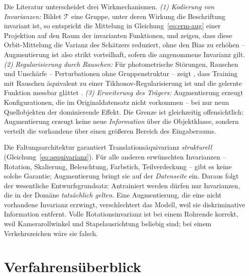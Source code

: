Die Literatur unterscheidet drei Wirkmechanismen. \emph{(1) Kodierung von
Invarianzen:} Bildet $\mathcal{T}$ eine Gruppe, unter deren Wirkung die
Beschriftung invariant ist, so entspricht die Mittelung in
Gleichung~\eqref{eq:erm-aug} einer Projektion auf den Raum der invarianten
Funktionen, und \textcite{chen2020group} zeigen, dass diese Orbit-Mittelung die
Varianz des Schätzers reduziert, ohne den Bias zu erhöhen -- Augmentierung ist
also strikt vorteilhaft, sofern die angenommene Invarianz gilt.
\emph{(2) Regularisierung durch Rauschen:} Für photometrische Störungen, Rauschen
und Unschärfe -- Perturbationen ohne Gruppenstruktur -- zeigt
\textcite{bishop1995}, dass Training mit Rauschen äquivalent zu einer
Tikhonov-Regularisierung ist und die gelernte Funktion messbar glättet
\parencite[vgl.\ auch][]{dao2019}. \emph{(3) Erweiterung des Trägers:}
Augmentierung erzeugt Konfigurationen, die im Originaldatensatz nicht vorkommen --
bei nur neun Quellobjekten der dominierende Effekt. Die Grenze ist gleichzeitig
offensichtlich: Augmentierung erzeugt keine neue \emph{Information} über die
Objektklasse, sondern verteilt die vorhandene über einen größeren Bereich des
Eingaberaums.

 Die Faltungsarchitektur garantiert
Translationsäquivarianz \emph{strukturell}
(Gleichung~\eqref{eq:aequivarianz}). Für alle anderen erwünschten Invarianzen --
Rotation, Skalierung, Beleuchtung, Farbstich, Teilverdeckung -- gibt es keine
solche Garantie; Augmentierung bringt sie auf der \emph{Datenseite} ein. Daraus
folgt der wesentliche Entwurfsgrundsatz: Antrainiert werden dürfen nur
Invarianzen, die in der Domäne \emph{tatsächlich gelten}. Eine Augmentierung, die
eine nicht vorhandene Invarianz erzwingt, verschlechtert das Modell, weil sie
diskriminative Information entfernt. Volle Rotationsinvarianz ist bei einem
Rohrende korrekt, weil Kamerarollwinkel und Stapelausrichtung beliebig sind; bei
einem Verkehrszeichen wäre sie falsch.

\section{Verfahrensüberblick}
\label{sec:augtaxonomie}

